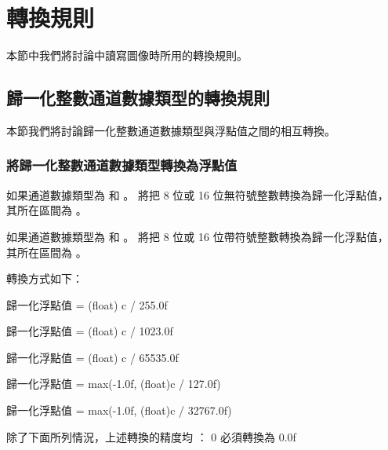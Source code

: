 \section[sec:conversionRule]{轉換規則}

本節中我們將討論中讀寫圖像時所用的轉換規則。

\subsection{歸一化整數通道數據類型的轉換規則}

本節我們將討論歸一化整數通道數據類型與浮點值之間的相互轉換。

\subsubsection[sec:normIntToFloat]{將歸一化整數通道數據類型轉換為浮點值}

如果通道數據類型為  和 。
 將把 8 位或 16 位無符號整數轉換為歸一化浮點值，
其所在區間為 \math{[0.0f \cdots 1.0]}。

如果通道數據類型為  和 。
 將把 8 位或 16 位帶符號整數轉換為歸一化浮點值，
其所在區間為 \math{[-1.0 \cdots 1.0]}。

轉換方式如下：

歸一化浮點值 = (float) c / 255.0f
\stopclCmmDesc

歸一化浮點值 = (float) c / 1023.0f
\stopclCmmDesc

歸一化浮點值 = (float) c / 65535.0f
\stopclCmmDesc

歸一化浮點值 = max(-1.0f, (float)c / 127.0f)
\stopclCmmDesc

歸一化浮點值 = max(-1.0f, (float)c / 32767.0f)
\stopclCmmDesc

除了下面所列情況，上述轉換的精度均 ：
0 必須轉換為 0.0f

